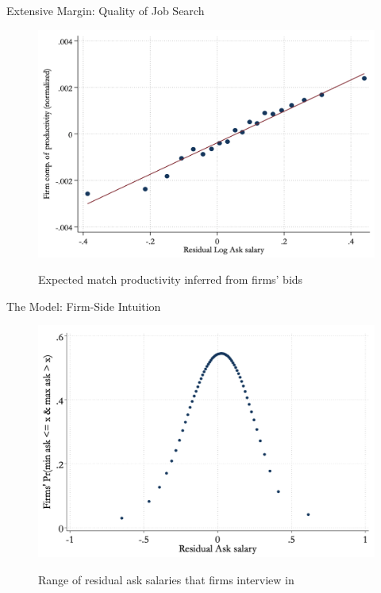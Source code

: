 \begin{frame}{Extensive Margin: Quality of Job Search}
    \begin{figure}
        \centering
        \includegraphics[height = 0.7 \textheight]{images/ask_productivity.png}

        {\footnotesize Expected match productivity inferred from firms' bids}
    \end{figure}
\end{frame}

\begin{frame}{The Model: Firm-Side Intuition}
    \begin{figure}
        \centering
        \includegraphics[height = 0.7 \textheight]{images/model_intuit.png}

        {\footnotesize Range of residual ask salaries that firms interview in}
    \end{figure}
\end{frame}

